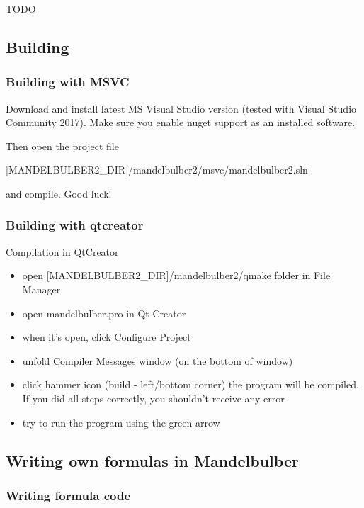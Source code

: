 TODO

\subsection{Building}\label{developers-building}
\subsubsection{Building with MSVC}\label{developers-building-msvc}

Download and install latest MS Visual Studio version (tested with Visual Studio Community 2017).
Make sure you enable nuget support as an installed software.

Then open the project file 

[MANDELBULBER2\_DIR]/mandelbulber2/msvc/mandelbulber2.sln

and compile. Good luck!

\subsubsection{Building with qtcreator}\label{developers-building-qtcreator}

Compilation in QtCreator

\begin{itemize}
	\item open [MANDELBULBER2\_DIR]/mandelbulber2/qmake folder in File Manager
	\item open mandelbulber.pro in Qt Creator
	\item when it's open, click Configure Project
	\item unfold Compiler Messages window (on the bottom of window)
	\item click hammer icon (build - left/bottom corner)
	   the program will be compiled. If you did all steps correctly, you shouldn't receive any error
	\item try to run the program using the green arrow
\end{itemize}

\subsection{Writing own formulas in Mandelbulber}\label{developers-writing-own-formulas}
\subsubsection{Writing formula code}\label{developers-writing-formula-code}

